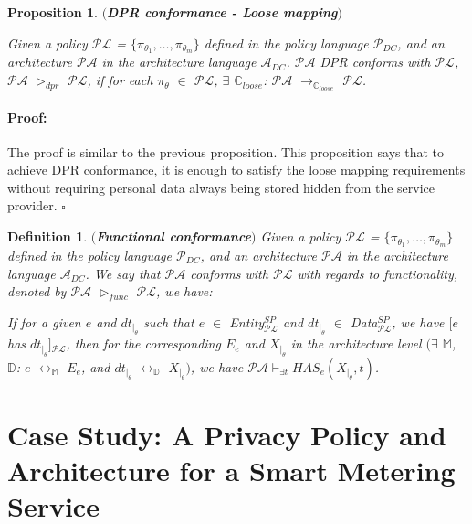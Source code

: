 \documentclass[a4paper]{article}
\newtheorem{ttd}{Definition}
\newtheorem{ttpp}{Proposition}
\newenvironment{proof}{\paragraph{Proof:}}{\hfill$\square$}
\begin{document}
\begin{ttpp}\label{prop:2} $($\textbf{DPR conformance - Loose mapping}$)$

\noindent Given a policy $\mathcal{P}\mathcal{L}$ = $\{\pi_{\theta_1}, \dots, \pi_{\theta_m}\}$ defined in the policy language $\mathcal{P}_{DC}$, and an   
architecture $\mathcal{P}\mathcal{A}$ in the architecture language $\mathcal{A}_{DC}$.  $\mathcal{P}\mathcal{A}$ DPR conforms with  $\mathcal{P}\mathcal{L}$, $\mathcal{P}\mathcal{A}$ $\triangleright_{dpr}$ $\mathcal{P}\mathcal{L}$, if for each $\pi_{\theta}$ $\in$ $\mathcal{P}\mathcal{L}$, $\exists$ $\mathbb{C}_{loose}$: $\mathcal{P}\mathcal{A}$ $\rightarrow_{\mathbb{C}_{loose}}$ $\mathcal{P}\mathcal{L}$.
\end{ttpp}
\begin{proof}
The proof is similar to the previous proposition. This proposition says that to achieve DPR conformance, it is enough to satisfy the loose mapping requirements without requiring personal data always being stored hidden from the service provider. 
\end{proof}

\begin{ttd}\label{func} $($\textbf{Functional conformance}$)$
Given a policy $\mathcal{P}\mathcal{L}$ = $\{\pi_{\theta_1}, \dots, \pi_{\theta_m}\}$ defined in the policy language $\mathcal{P}_{DC}$, and an   
architecture $\mathcal{P}\mathcal{A}$ in the architecture language $\mathcal{A}_{DC}$. We say that $\mathcal{P}\mathcal{A}$ conforms with $\mathcal{P}\mathcal{L}$ with regards to functionality, denoted by  $\mathcal{P}\mathcal{A}$ $\triangleright_{func}$ $\mathcal{P}\mathcal{L}$,  we have:

If for a given $e$ and $dt_{|_{\theta}}$ such that $e$ $\in$ \textit{Entity}$^{SP}_{\mathcal{P}\mathcal{L}}$ and $dt_{|_{\theta}}$ $\in$ \textit{Data}$^{SP}_{\mathcal{P}\mathcal{L}}$, we have $[e$ has $dt_{|_{\theta}}]$$_{\mathcal{P}\mathcal{L}}$, then for the corresponding $E_e$ and  $X_{|_{\theta}}$ in the architecture level $($$\exists$ $\mathbb{M}$, $\mathbb{D}$: $e$ $\leftrightarrow_\mathbb{M}$ $E_e$,  and  $dt_{|_{\theta}}$ $\leftrightarrow_\mathbb{D}$ $X_{|_{\theta}}$$)$, we have $\mathcal{P}\mathcal{A} \vdash_{\exists t} \textit{HAS}_{e}\left(X_{|_{\theta}}, t \right)$.  

\end{ttd} 


\section{Case Study: A Privacy Policy and Architecture for a Smart Metering Service} 
\label{pol:smartmeter}
\end{document}
